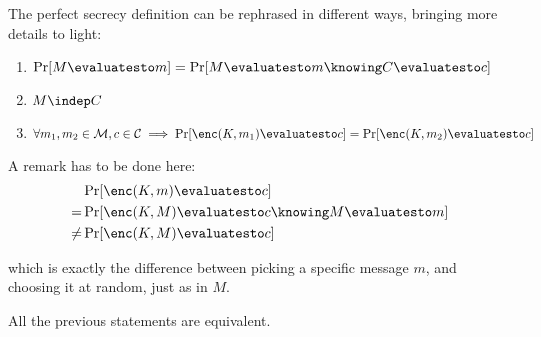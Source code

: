 The perfect secrecy definition can be rephrased in different ways, bringing more details to light:
\begin{enumerate}
    \item $\Pr[M \evaluatesto m] = \Pr[M \evaluatesto m \knowing C \evaluatesto c]$
    \item $M \indep C$
    \item $\forall m_1, m_2 \in \M, c \in \C \implies \Pr[\enc(K, m_1) \evaluatesto c] = \Pr[\enc(K, m_2) \evaluatesto c]$
\end{enumerate}

A remark has to be done here:
\begin{align*}
    & \Pr[\enc(K, m) \evaluatesto c] \\
    =& \Pr[\enc(K, M) \evaluatesto c \knowing M \evaluatesto m] \\
    \neq& \Pr[\enc(K, M) \evaluatesto c]
\end{align*}

which is exactly the difference between picking a specific message $m$, and choosing it at random, just as in $M$.
    
\begin{proposition}
    All the previous statements are equivalent.
\end{proposition}

